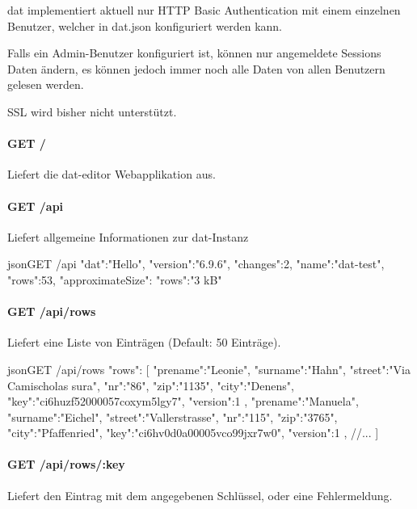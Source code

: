 dat implementiert aktuell nur HTTP Basic Authentication mit einem einzelnen Benutzer, welcher in dat.json konfiguriert werden kann. 

Falls ein Admin-Benutzer konfiguriert ist, können nur angemeldete Sessions Daten ändern, es können jedoch immer noch alle Daten von allen Benutzern gelesen werden.

SSL wird bisher nicht unterstützt.

\paragraph{GET /}
Liefert die dat-editor Webapplikation aus.

\paragraph{GET /api} Liefert allgemeine Informationen zur dat-Instanz
\begin{srclst}{json}{GET /api}
    {
        "dat":"Hello",
        "version":"6.9.6",
        "changes":2,
        "name":"dat-test",
        "rows":53,
        "approximateSize":{
            "rows":"3 kB"
        }
    }
\end{srclst}

\paragraph{GET /api/rows} 
Liefert eine Liste von Einträgen (Default: 50 Einträge).
\begin{srclst}{json}{GET /api/rows}
{
    "rows": [
        {
            "prename":"Leonie", "surname":"Hahn", 
            "street":"Via Camischolas sura", "nr":"86", 
            "zip":"1135", "city":"Denens", 
            "key":"ci6huzf52000057coxym5lgy7", "version":1
        },
        {
            "prename":"Manuela", "surname":"Eichel", 
            "street":"Vallerstrasse", "nr":"115",
            "zip":"3765", "city":"Pfaffenried", 
            "key":"ci6hv0d0a00005vco99jxr7w0", "version":1
        },
        //...
    ]
}
\end{srclst}

\paragraph{GET /api/rows/:key}
Liefert den Eintrag mit dem angegebenen Schlüssel, oder eine Fehlermeldung.

